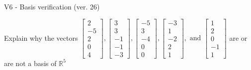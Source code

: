 \begin{exercise}
  \begin{exerciseTitle}V6 - Basis verification (ver. 26)\end{exerciseTitle}
  \begin{exerciseStatement}
    Explain why the vectors \(\left[\begin{array}{r}
2 \\
-5 \\
2 \\
0 \\
4
\end{array}\right] , \left[\begin{array}{r}
3 \\
3 \\
-1 \\
-1 \\
-3
\end{array}\right] , \left[\begin{array}{r}
-5 \\
3 \\
-4 \\
0 \\
0
\end{array}\right] , \left[\begin{array}{r}
-3 \\
1 \\
-2 \\
2 \\
1
\end{array}\right] , \text{ and } \left[\begin{array}{r}
1 \\
2 \\
0 \\
-1 \\
1
\end{array}\right]\) are or are not a basis of \(\mathbb{R}^5\)	



\end{exerciseStatement}
\end{exercise}
